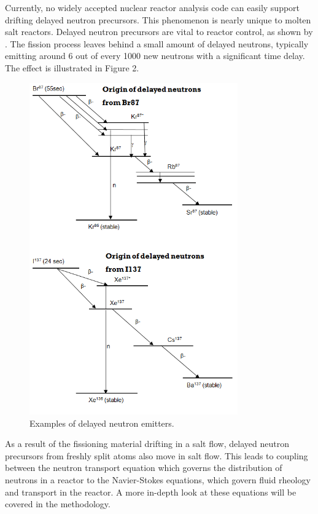 Currently, no widely accepted nuclear reactor analysis code can easily support drifting delayed neutron precursors. This phenomenon is nearly unique to molten salt reactors. Delayed neutron precursors are vital to reactor control, as shown by \cite[Ch. 6]{duderstadt_nuclear_1976}. The fission process leaves behind a small amount of delayed neutrons, typically emitting around 6 out of every 1000 new neutrons with a significant time delay. The effect is illustrated in Figure 2.

\begin{figure}
\includegraphics[width=0.8\textwidth]{dnp}
\caption{Examples of delayed neutron emitters.}
\label{fig:dnps}
\end{figure}

	As a result of the fissioning material drifting in a salt flow, delayed neutron precursors from freshly split atoms also move in salt flow. This leads to coupling between the neutron transport equation which governs the distribution of neutrons in a reactor to the Navier-Stokes equations, which govern fluid rheology and transport in the reactor. A more in-depth look at these equations will be covered in the methodology.

